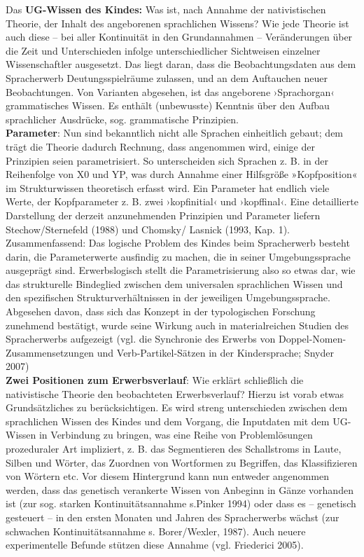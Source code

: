 \documentclass[
  letterpaper,
]{scrbook}
\begin{document}
Das \textbf{UG-Wissen des Kindes:} Was ist, nach Annahme der
nativistischen Theorie, der Inhalt des angeborenen sprachlichen Wissens?
Wie jede Theorie ist auch diese -- bei aller Kontinuität in den
Grundannahmen -- Veränderungen über die Zeit und Unterschieden infolge
unterschiedlicher Sichtweisen einzelner Wissenschaftler ausgesetzt. Das
liegt daran, dass die Beobachtungsdaten aus dem Spracherwerb
Deutungsspielräume zulassen, und an dem Auftauchen neuer Beobachtungen.
Von Varianten abgesehen, ist das angeborene ›Sprachorgan‹ grammatisches
Wissen. Es enthält (unbewusste) Kenntnis über den Aufbau sprachlicher
Ausdrücke, sog. grammatische Prinzipien.\\
\textbf{Parameter}: Nun sind bekanntlich nicht alle Sprachen einheitlich
gebaut; dem trägt die Theorie dadurch Rechnung, dass angenommen wird,
einige der Prinzipien seien parametrisiert. So unterscheiden sich
Sprachen z. B. in der Reihenfolge von X0 und YP, was durch Annahme einer
Hilfsgröße »Kopfposition« im Strukturwissen theoretisch erfasst wird.
Ein Parameter hat endlich viele Werte, der Kopfparameter z. B. zwei
›kopfinitial‹ und ›kopffinal‹. Eine detaillierte Darstellung der derzeit
anzunehmenden Prinzipien und Parameter liefern Stechow/Sternefeld (1988)
und Chomsky/ Lasnick (1993, Kap. 1). Zusammenfassend: Das logische
Problem des Kindes beim Spracherwerb besteht darin, die Parameterwerte
ausfindig zu machen, die in seiner Umgebungssprache ausgeprägt sind.
Erwerbslogisch stellt die Parametrisierung also so etwas dar, wie das
strukturelle Bindeglied zwischen dem universalen sprachlichen Wissen und
den spezifischen Strukturverhältnissen in der jeweiligen
Umgebungssprache. Abgesehen davon, dass sich das Konzept in der
typologischen Forschung zunehmend bestätigt, wurde seine Wirkung auch in
materialreichen Studien des Spracherwerbs aufgezeigt (vgl. die
Synchronie des Erwerbs von Doppel-Nomen-Zusammensetzungen und
Verb-Partikel-Sätzen in der Kindersprache; Snyder 2007)\\

\textbf{Zwei Positionen zum Erwerbsverlauf}: Wie erklärt schließlich die
nativistische Theorie den beobachteten Erwerbsverlauf? Hierzu ist vorab
etwas Grundsätzliches zu berücksichtigen. Es wird streng unterschieden
zwischen dem sprachlichen Wissen des Kindes und dem Vorgang, die
Inputdaten mit dem UG-Wissen in Verbindung zu bringen, was eine Reihe
von Problemlösungen prozeduraler Art impliziert, z. B. das Segmentieren
des Schallstroms in Laute, Silben und Wörter, das Zuordnen von
Wortformen zu Begriffen, das Klassifizieren von Wörtern etc. Vor diesem
Hintergrund kann nun entweder angenommen werden, dass das genetisch
verankerte Wissen von Anbeginn in Gänze vorhanden ist (zur sog. starken
Kontinuitätsannahme s.Pinker 1994) oder dass es -- genetisch gesteuert
-- in den ersten Monaten und Jahren des Spracherwerbs wächst (zur
schwachen Kontinuitätsannahme s. Borer/Wexler, 1987). Auch neuere
experimentelle Befunde stützen diese Annahme (vgl. Friederici 2005).\\
\end{document}
